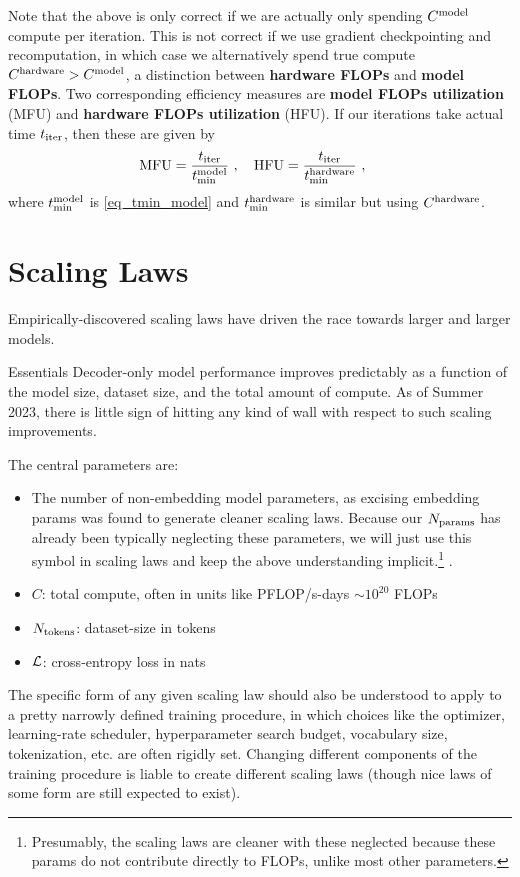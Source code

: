 \documentclass[11pt]{article}
\begin{document}
Note that the above is only correct if we are actually only spending $C  ^{ {\rm  model}  }$
compute per iteration. This is not correct if we use gradient checkpointing and recomputation, in which case
we alternatively spend true compute  $C  ^{ {\rm  hardware}  } > C  ^{ {\rm  model}  } $,
a distinction between \textbf{hardware FLOPs} and \textbf{model FLOPs}. Two corresponding efficiency
measures are \textbf{model FLOPs utilization} (MFU) and \textbf{hardware FLOPs utilization}  (HFU).
If our iterations take actual time $ t _{ {\rm iter} } $, then these are given by
\begin{align}
    {\rm MFU} &= \frac{ t _{ {\rm iter} } }{ t _{ {\rm  min} } ^{ {\rm  model} } } \ , \quad {\rm HFU} = \frac{ t _{ {\rm iter} } }{ t _{ {\rm  min} } ^{ {\rm  hardware} } } \ , \label{eq_mfu}
\end{align}
where $ t _{ {\rm min} } ^{ {\rm  model} } $ is \eqref{eq_tmin_model} and $ t _{ {\rm min} } ^{ {\rm  hardware} } $ is similar but using
$ C  ^{ {\rm  hardware} } $.


\section{Scaling Laws \label{sec_scaling_laws}}


Empirically-discovered scaling laws have driven the race towards larger and larger models.
\begin{nicebox}{Essentials}
Decoder-only model performance improves predictably as a function of the model size, dataset size,
and the total amount of compute. As of Summer 2023, there is little sign of hitting any kind of wall
with respect to such scaling improvements.
\end{nicebox}


The central parameters are:
\begin{itemize}
    \item The number of non-embedding model parameters, as excising embedding params was found to
        generate cleaner scaling laws. Because our $ N _{ {\rm params} }$ has already been typically
        neglecting these parameters, we will just use this symbol in scaling laws and keep the above
        understanding implicit.\footnote{Presumably, the scaling laws are
            cleaner with these neglected because these params do not contribute directly to
FLOPs, unlike most other parameters.} \cite{kaplan2020scaling}.
    \item $ C $: total compute, often in units like PFLOP/s-days $ \sim 10 ^{ 20 } $ FLOPs
    \item $ N _{ {\rm tokens} } $: dataset-size in tokens
    \item $\mathcal{L}$: cross-entropy loss in nats
\end{itemize}
The specific form of any given scaling law should also be understood to apply to a pretty narrowly
defined training procedure, in which choices like the optimizer, learning-rate scheduler,
hyperparameter search budget, vocabulary size, tokenization, etc. are often rigidly set. Changing
different components of the training procedure is liable to create different scaling laws (though
nice laws of some form are still expected to exist).
\end{document}
